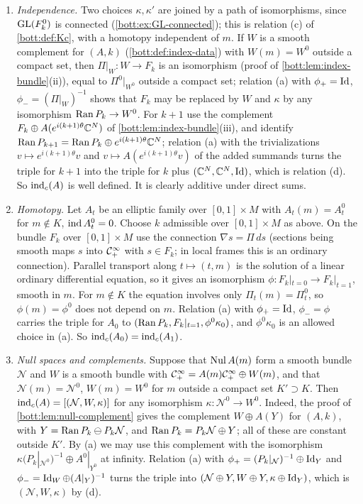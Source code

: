 \begin{enumerate}[label=(\alph*),leftmargin=*]
\item \emph{Independence.} Two choices $\kappa,\kappa'$ are joined by a path of
  isomorphisms, since $\operatorname{GL}(F_k^0)$ is connected (\cref{bott:ex:GL-connected}); this is
  relation (c) of \cref{bott:def:Kc}, with a homotopy independent of $m$. If $W$ is a smooth
  complement for $(A,k)$ (\cref{bott:def:index-data}) with $W(m)=W^0$ outside a compact set,
  then $\Pi|_W\colon W\to F_k$ is an isomorphism (proof of
  \cref{bott:lem:index-bundle}(ii)), equal to $\Pi^0|_{W^0}$ outside a compact set; relation
  (a) with $\phi_+=\operatorname{Id}$, $\phi_-=(\Pi|_W)^{-1}$ shows that $F_k$ may be replaced by $W$ and
  $\kappa$ by any isomorphism $\operatorname{Ran} P_k\to W^0$. For $k+1$ use the complement
  $F_k\oplus A(e^{i(k+1)\theta}\mathbb{C}^N)$ of \cref{bott:lem:index-bundle}(iii), and identify
  $\operatorname{Ran} P_{k+1}=\operatorname{Ran} P_k\oplus e^{i(k+1)\theta}\mathbb{C}^N$; relation (a) with the trivializations
  $v\mapsto e^{i(k+1)\theta}v$ and $v\mapsto A(e^{i(k+1)\theta}v)$ of the added summands turns
  the triple for $k+1$ into the triple for $k$ plus $(\mathbb{C}^N,\mathbb{C}^N,\operatorname{Id})$, which is relation (d).
  So $\operatorname{ind}_c(A)$ is well defined. It is clearly additive under direct sums.
\item \emph{Homotopy.} Let $A_t$ be an elliptic family over $[0,1]\times M$ with
  $A_t(m)=A^0_t$ for $m\notin K$, $\operatorname{ind} A_t^0=0$. Choose $k$ admissible over $[0,1]\times M$
  as above. On the bundle $F_k$ over $[0,1]\times M$ use the connection $\nabla s=\Pi\,ds$
  (sections being smooth maps $s$ into $\mathcal{C}^\infty_+$ with $s\in F_k$; in local frames this is an
  ordinary connection). Parallel transport along $t\mapsto(t,m)$ is the solution of a linear
  ordinary differential equation, so it gives an isomorphism
  $\phi\colon F_k|_{t=0}\to F_k|_{t=1}$, smooth in $m$. For $m\notin K$ the equation involves
  only $\Pi_t(m)=\Pi^0_t$, so $\phi(m)=\phi^0$ does not depend on $m$. Relation (a) with
  $\phi_+=\operatorname{Id}$, $\phi_-=\phi$ carries the triple for $A_0$ to
  $(\operatorname{Ran} P_k,F_k|_{t=1},\phi^0\kappa_0)$, and $\phi^0\kappa_0$ is an allowed choice in (a). So
  $\operatorname{ind}_c(A_0)=\operatorname{ind}_c(A_1)$.
\item \emph{Null spaces and complements.} Suppose that $\operatorname{Nul} A(m)$ form a smooth bundle
  $\mathcal N$ and $W$ is a smooth bundle with $\mathcal{C}^\infty_+=A(m)\mathcal{C}^\infty_+\oplus W(m)$, and that
  $\mathcal N(m)=\mathcal N^0$, $W(m)=W^0$ for $m$ outside a compact set $K'\supset K$. Then
  $\operatorname{ind}_c(A)=[(\mathcal N,W,\kappa)]$ for any isomorphism $\kappa\colon\mathcal N^0\to W^0$.
  Indeed, the proof of \cref{bott:lem:null-complement} gives the complement $W\oplus A(Y)$ for
  $(A,k)$, with $Y=\operatorname{Ran} P_k\ominus P_k\mathcal N$, and $\operatorname{Ran} P_k=P_k\mathcal N\oplus Y$; all
  of these are constant outside $K'$. By (a) we may use this complement with the isomorphism
  $\kappa(P_k|_{\mathcal N^0})^{-1}\oplus A^0|_{Y^0}$ at infinity. Relation (a) with
  $\phi_+=(P_k|_{\mathcal N})^{-1}\oplus\operatorname{Id}_Y$ and $\phi_-=\operatorname{Id}_W\oplus(A|_Y)^{-1}$ turns the
  triple into $(\mathcal N\oplus Y,W\oplus Y,\kappa\oplus\operatorname{Id}_Y)$, which is
  $(\mathcal N,W,\kappa)$ by (d).
\end{enumerate}

